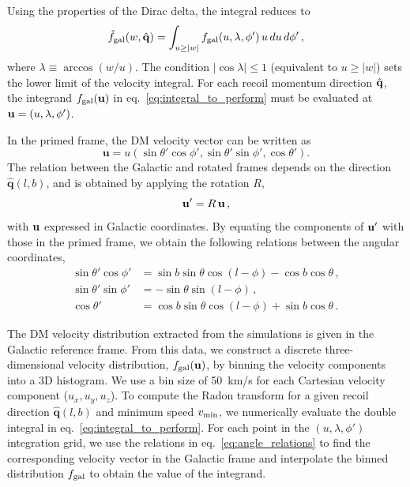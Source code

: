 \documentclass[a4paper,11pt]{article}
\begin{document}
Using the properties of the Dirac delta, the integral reduces to 
%
\begin{equation}
\label{eq:integral_to_perform}
\hat{f}_{\rm gal}(w,\hat{\mathbf{q}}) = \int_{u\geq |w|} f_{\rm gal}(u,\lambda,\phi')\,u \,du\, d\phi'\,,
\end{equation}
where $\lambda \equiv \arccos(w/u)$. The condition $|\cos\lambda| \leq 1$ (equivalent to $u \geq |w|$) sets the lower limit of the velocity integral. For each recoil momentum direction $\hat{\bf q}$, the integrand $f_{\rm{gal}}(\mathbf{u})$ in eq.~\eqref{eq:integral_to_perform} must be evaluated at  ${\bf u}=(u,\lambda,\phi')$. 

In the primed frame, the DM velocity vector can be written as 
\[\mathbf{u} = u(\sin \theta' \cos \phi', \sin \theta' \sin \phi', \cos\theta'). \]
The relation between the Galactic and rotated frames depends on the direction $\hat{\mathbf{q}}(l, b)$, and is obtained by applying  the rotation $R$,
\begin{equation}
{\bf u'}=R\, {\bf u} \, ,
\end{equation}
with ${\bf u}$ expressed in Galactic coordinates. By equating the components of ${\bf u'}$ with those in the primed frame, we obtain the following relations between the angular coordinates, 
%
\begin{align}
\sin{\theta'}\cos{\phi'} &= \sin{b}\sin{\theta}\cos{(l-\phi)} - \cos{b}\cos{\theta} \, ,\nonumber\\
 \sin{\theta'}\sin{\phi'}  &= -\sin{\theta} \sin{(l-\phi)}\, ,\nonumber\\
\cos{\theta}' &= \cos{b}\sin{\theta}\cos{(l-\phi)} + \sin{b}\cos{\theta}\, .
\label{eq:angle_relations}
\end{align}



The DM velocity distribution extracted from the simulations is given in the Galactic reference frame. From this data, we construct a discrete three-dimensional velocity distribution, \(f_{\rm{gal}}(\mathbf{u})\), by binning the velocity components into a 3D histogram. We use a  bin size of 50~km/s for each Cartesian velocity component (\(u_{x}, u_{y}, u_{z}\)). To compute the Radon transform for a given recoil direction \(\hat{\mathbf{q}}(l,b)\) and minimum speed $v_{\rm min}$, we numerically evaluate the double integral in eq.~\eqref{eq:integral_to_perform}. For each point in the \((u, \lambda, \phi')\) integration grid, we use the relations in eq.~\eqref{eq:angle_relations} to find the corresponding  velocity vector in the Galactic frame and interpolate the binned distribution \(f_{\rm{gal}}\) to obtain the value of the integrand.
\end{document}

